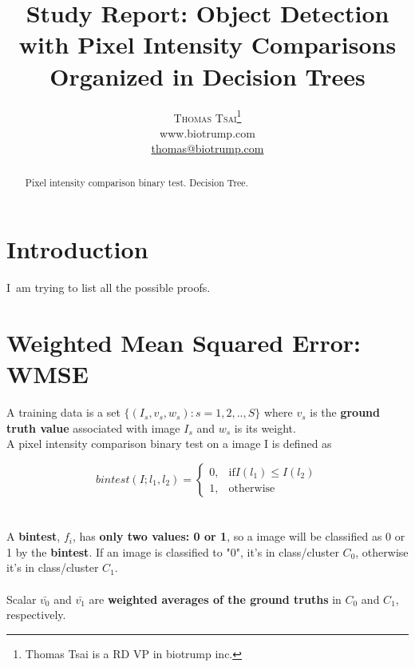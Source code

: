 \documentclass[a4paper,12pt]{article}
\title{\vspace{-15mm}\fontsize{24pt}{10pt}\selectfont\textbf{Study Report: Object Detection with Pixel Intensity Comparisons Organized in Decision Trees}} %
\author{
\large
\textsc{Thomas Tsai}\thanks{Thomas Tsai is a RD VP in biotrump inc.}\\[2mm] %
\normalsize www.biotrump.com \\ %
\normalsize \href{mailto:thomas@biotrump.com}{thomas@biotrump.com} %
\vspace{-5mm}
}
\date{}
\begin{document}
\maketitle %



\begin{abstract}

Pixel intensity comparison binary test. \cite{DBLP:journals/corr/abs-1305-4537} Decision Tree.

\end{abstract}



\section{Introduction}
\lettrine[nindent=0em,lines=2]{I}\ am trying to list all the possible proofs.

\section{Weighted Mean Squared Error: WMSE}
A training data is a set $\{(I_s,v_s,w_s) : s=1,2,..,S\}$
where $v_s$ is the \textbf{ground truth value} associated with image $I_s$ and $w_s$ is its weight.
\\ A pixel intensity comparison binary test on a image I is defined as

\begin{equation}
\label{eq:bintest}
    bintest(I;l_1,l_2)=
\begin{cases}
    0,		& \text{if} I(l_1)\leq I(l_2)\\
    1,      & \text{otherwise}
\end{cases}
\end{equation}\\
\\ A \textbf{bintest}, $f_i$, has \textbf{only two values: 0 or 1}, so a image will be classified as 0 or 1 by the \textbf{bintest}. If an image is classified to "0", it's in class/cluster $C_0$, otherwise it's in class/cluster $C_1$. \\
\\ Scalar $\bar{v_0}$ and $\bar{v_1}$ are \textbf{weighted averages of the ground truths} in $C_0$ and $C_1$, respectively.
\end{document}
